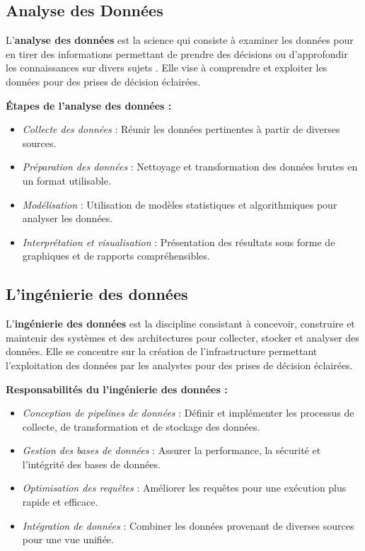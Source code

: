     \subsection{Analyse des Données}
    
    L'\textbf{analyse des données} est la science qui consiste à examiner les données pour en tirer des informations permettant de prendre des décisions ou d'approfondir les connaissances sur divers sujets \cite{analyse}. Elle vise à comprendre et exploiter les données pour des prises de décision éclairées.
    
    \textbf{Étapes de l'analyse des données :}
    \begin{itemize}
        \item \textit{Collecte des données} : Réunir les données pertinentes à partir de diverses sources.
        \item \textit{Préparation des données} : Nettoyage et transformation des données brutes en un format utilisable.
        \item \textit{Modélisation} : Utilisation de modèles statistiques et algorithmiques pour analyser les données.
        \item \textit{Interprétation et visualisation} : Présentation des résultats sous forme de graphiques et de rapports compréhensibles.
    \end{itemize}
    
    \subsection{L'ingénierie des données}
    
    L'\textbf{ingénierie des données} est la discipline consistant à concevoir, construire et maintenir des systèmes et des architectures pour collecter, stocker et analyser des données. Elle se concentre sur la création de l'infrastructure permettant l'exploitation des données par les analystes pour des prises de décision éclairées.
    
    \textbf{Responsabilités du l'ingénierie des données :}
    \begin{itemize}
        \item \textit{Conception de pipelines de données} : Définir et implémenter les processus de collecte, de transformation et de stockage des données.
        \item \textit{Gestion des bases de données} : Assurer la performance, la sécurité et l'intégrité des bases de données.
        \item \textit{Optimisation des requêtes} : Améliorer les requêtes pour une exécution plus rapide et efficace.
        \item \textit{Intégration de données} : Combiner les données provenant de diverses sources pour une vue unifiée.
    \end{itemize}
    
